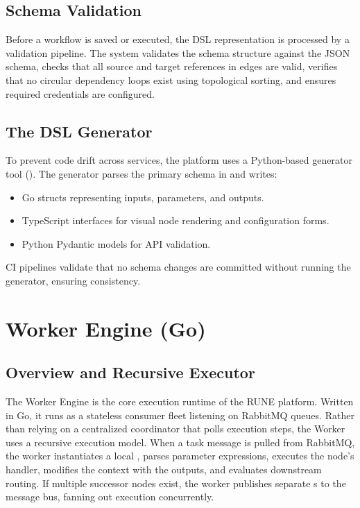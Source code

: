 \documentclass[12pt]{report}
\begin{document}
\section{Schema Validation}
Before a workflow is saved or executed, the DSL representation is processed by a validation pipeline. The system validates the schema structure against the JSON schema, checks that all source and target references in edges are valid, verifies that no circular dependency loops exist using topological sorting, and ensures required credentials are configured.

\section{The DSL Generator}
To prevent code drift across services, the platform uses a Python-based generator tool (). The generator parses the primary schema in  and writes:
\begin{itemize}
    \item Go structs representing inputs, parameters, and outputs.
    \item TypeScript interfaces for visual node rendering and configuration forms.
    \item Python Pydantic models for API validation.
\end{itemize}
CI pipelines validate that no schema changes are committed without running the generator, ensuring consistency.

\chapter{Worker Engine (Go)}
\label{ch:worker_engine}

\section{Overview and Recursive Executor}
The Worker Engine is the core execution runtime of the RUNE platform. Written in Go, it runs as a stateless consumer fleet listening on RabbitMQ queues. 
Rather than relying on a centralized coordinator that polls execution steps, the Worker uses a recursive execution model. When a task message is pulled from RabbitMQ, the worker instantiates a local , parses parameter expressions, executes the node's handler, modifies the context with the outputs, and evaluates downstream routing. If multiple successor nodes exist, the worker publishes separate s to the message bus, fanning out execution concurrently.
\end{document}
